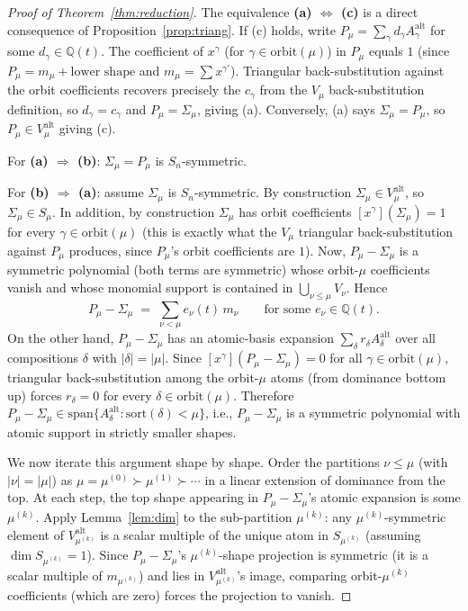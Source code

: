 \documentclass[11pt]{article}
\theoremstyle{definition}
\newcommand{\alt}{\mathrm{alt}}
\newcommand{\orbit}{\mathrm{orbit}}
\newcommand{\QQ}{\mathbb{Q}}
\newcommand{\sort}{\mathrm{sort}}
\newcommand{\Sig}{\Sigma_\mu}
\begin{document}
\begin{proof}[Proof of Theorem~\ref{thm:reduction}]
The equivalence \textbf{(a) $\Leftrightarrow$ (c)} is a direct
consequence of Proposition~\ref{prop:triang}.  If (c) holds, write
$P_\mu = \sum_\gamma d_\gamma A^\alt_\gamma$ for some $d_\gamma\in\QQ(t)$.
The coefficient of $x^\gamma$ (for $\gamma\in\orbit(\mu)$) in $P_\mu$
equals $1$ (since $P_\mu = m_\mu + \text{lower shape}$ and $m_\mu = \sum
x^{\gamma'}$).  Triangular back-substitution against the orbit
coefficients recovers precisely the $c_\gamma$ from the $V_\mu$
back-substitution definition, so $d_\gamma = c_\gamma$ and $P_\mu =
\Sig$, giving (a).  Conversely, (a) says $\Sig = P_\mu$, so $P_\mu \in
V_\mu^\alt$ giving (c).

\smallskip

For \textbf{(a) $\Rightarrow$ (b)}: $\Sig = P_\mu$ is $S_n$-symmetric.

For \textbf{(b) $\Rightarrow$ (a)}: assume $\Sig$ is $S_n$-symmetric.
By construction $\Sig\in V_\mu^\alt$, so $\Sig\in S_\mu$.  In addition,
by construction $\Sig$ has orbit coefficients $[x^\gamma](\Sig) = 1$ for
every $\gamma\in\orbit(\mu)$ (this is exactly what the $V_\mu$
triangular back-substitution against $P_\mu$ produces, since $P_\mu$'s
orbit coefficients are $1$).  Now, $P_\mu - \Sig$ is a symmetric
polynomial (both terms are symmetric) whose orbit-$\mu$ coefficients
vanish and whose monomial support is contained in $\bigcup_{\nu\le\mu}
V_\nu$.  Hence
\[
P_\mu - \Sig \;=\; \sum_{\nu < \mu} e_\nu(t)\, m_\nu \qquad \text{for some } e_\nu\in\QQ(t).
\]
On the other hand, $P_\mu - \Sig$ has an atomic-basis expansion
$\sum_\delta r_\delta A^\alt_\delta$ over all compositions $\delta$
with $|\delta|=|\mu|$.  Since $[x^\gamma](P_\mu-\Sig) = 0$ for all
$\gamma\in\orbit(\mu)$, triangular back-substitution among the
orbit-$\mu$ atoms (from dominance bottom up) forces $r_\delta = 0$
for every $\delta\in\orbit(\mu)$.  Therefore
$P_\mu - \Sig \in \mathrm{span}\{A^\alt_\delta : \sort(\delta)<\mu\}$,
i.e., $P_\mu - \Sig$ is a symmetric polynomial with atomic support in
strictly smaller shapes.

We now iterate this argument shape by shape.  Order the partitions
$\nu\le\mu$ (with $|\nu|=|\mu|$) as $\mu = \mu^{(0)} \succ \mu^{(1)}
\succ \cdots$ in a linear extension of dominance from the top.  At each
step, the top shape appearing in $P_\mu - \Sig$'s atomic expansion is
some $\mu^{(k)}$.  Apply Lemma~\ref{lem:dim} to the sub-partition
$\mu^{(k)}$: any $\mu^{(k)}$-symmetric element of $V_{\mu^{(k)}}^\alt$
is a scalar multiple of the unique atom in $S_{\mu^{(k)}}$ (assuming
$\dim S_{\mu^{(k)}}=1$).  Since $P_\mu-\Sig$'s $\mu^{(k)}$-shape
projection is symmetric (it is a scalar multiple of $m_{\mu^{(k)}}$)
and lies in $V_{\mu^{(k)}}^\alt$'s image, comparing orbit-$\mu^{(k)}$
coefficients (which are zero) forces the projection to vanish.


\end{proof}
\end{document}
